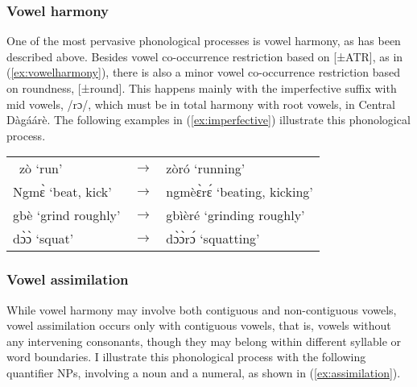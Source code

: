 \begin{refsection}
\subsubsection{Vowel harmony}
One of the most pervasive phonological processes is vowel harmony, as has been
described above. Besides vowel co-occurrence restriction based on [±ATR], as in (\ref{ex:vowelharmony}), there is
also a minor vowel co-occurrence restriction based on roundness, [±round]. This happens
mainly with the imperfective suffix with mid vowels, /rɔ/, which must be in total harmony
with root vowels, in Central Dàgáárè. The following examples in (\ref{ex:imperfective}) illustrate this
phonological process.


\ea \label{ex:imperfective} \begin{tabular}{lll} \ zò ‘run’&  $\rightarrow$ & zòró ‘running’\\
Ngmɛ̀ ‘beat, kick’  & $\rightarrow$  & ngmèɛ̀rɛ́ ‘beating, kicking’\\
gbè ‘grind roughly’& $\rightarrow$ & gbìèré ‘grinding roughly’\\
dɔ̀ɔ̀ ‘squat’&  $\rightarrow$ &   dɔ̀ɔ̀rɔ́ ‘squatting’\\
\end{tabular}
\z 


\subsubsection{Vowel assimilation}
While vowel harmony may involve both contiguous and non-contiguous vowels,
vowel assimilation occurs only with contiguous vowels, that is, vowels without any intervening consonants, though they may belong within different syllable or word boundaries. I illustrate this phonological process with the following quantifier NPs, involving a noun and a numeral, as shown in (\ref{ex:assimilation}).

\ea \label{ex:assimilation} 
\z\z 








\end{refsection}
